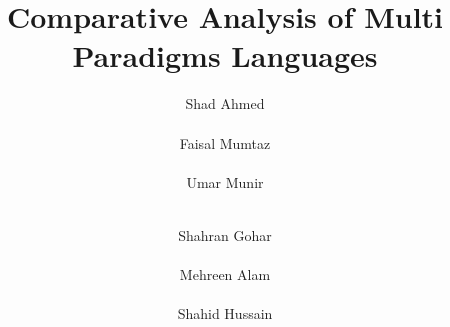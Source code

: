 \documentclass{sig-alternate}
\begin{document}
%

\title{Comparative Analysis of Multi Paradigms Languages}

%
%
%
%
%

%
\author{
%
%
\alignauthor
Shad Ahmed\\
       \\
\alignauthor
Faisal Mumtaz\\
\\
\alignauthor Umar Munir\\
\\
\and  %
\alignauthor Shahran Gohar \\
\\
\alignauthor Mehreen Alam\\
\\
\alignauthor Shahid Hussain\\
\\
}
\end{document}
